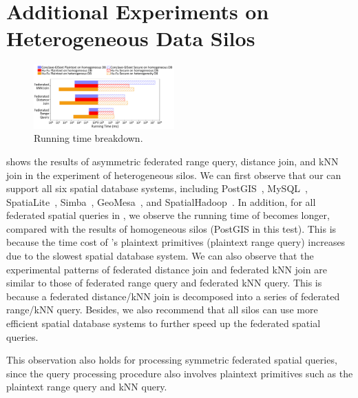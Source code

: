 \section{Additional Experiments on Heterogeneous Data Silos}\label{app:exp-2}

\begin{figure}[t]
    \centering
    \includegraphics[width=0.48\textwidth]{apdx/database_compare_range.pdf}
    \caption{Running time breakdown.}
    \label{fig:database-cmp-range}
\end{figure}

 shows the results of asymmetric federated range query, distance join, and kNN join in the experiment of heterogeneous silos.
We can first observe that our \sysname can support all six spatial database systems, including PostGIS~\cite{postgis}, MySQL~\cite{mysql}, SpatiaLite~\cite{spatialite}, Simba~\cite{sigmod16simba}, GeoMesa~\cite{ds15geomesa}, and SpatialHadoop~\cite{icde15spatialhadoop}.
In addition, for all federated spatial queries in , we observe the running time of \sysname becomes longer, compared with the results of homogeneous silos (\ie PostGIS in this test).
This is because the time cost of \sysname's plaintext primitives (\ie plaintext range query) increases due to the slowest spatial database system.
We can also observe that the experimental patterns of federated distance join and federated kNN join are similar to those of federated range query and federated kNN query.
This is because a federated distance/kNN join is decomposed into a series of federated range/kNN query.
Besides, we also recommend that all silos can use more efficient spatial database systems to further speed up the federated spatial queries.

This observation also holds for processing symmetric federated spatial queries, since the query processing procedure also involves plaintext primitives such as the plaintext range query and kNN query.

